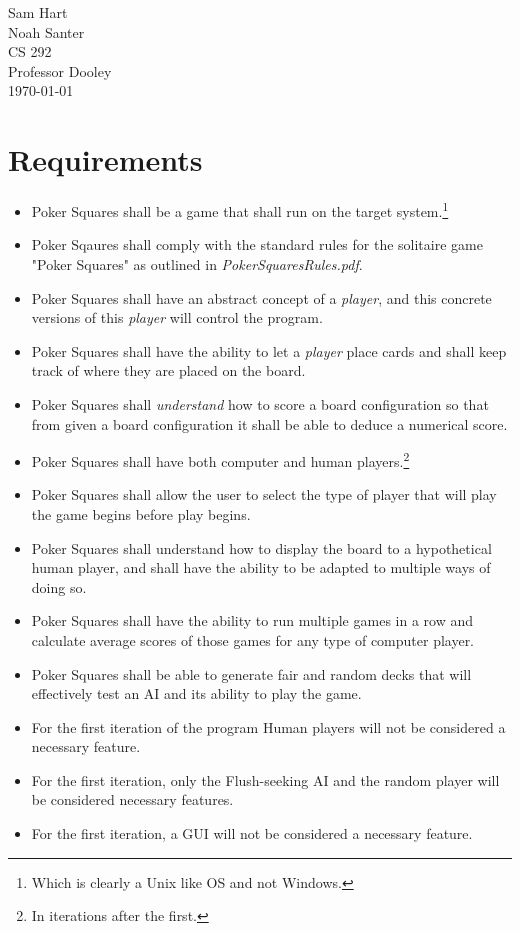 \documentclass[12pt]{article}
\begin{document}
\noindent Sam Hart \\
Noah Santer \\
CS 292 \\
Professor Dooley \\
\today \\

\section{Requirements}

\begin{itemize}
    \item Poker Squares shall be a game that shall run on the target system.\footnote[1]{Which is clearly a Unix like OS and not Windows.}
    \item Poker Sqaures shall comply with the standard rules for the solitaire game "Poker Squares" as outlined in \textit{PokerSquaresRules.pdf}.
    \item Poker Squares shall have an abstract concept of a \textit{player}, and this concrete versions of this \textit{player} will control the program.
    \item Poker Squares shall have the ability to let a \textit{player} place cards and shall keep track of where they are placed on the board.
    \item Poker Squares shall \textit{understand} how to score a board configuration so that from given a board configuration it shall be able to deduce a numerical score.
    \item Poker Squares shall have both computer and human players.\footnote[2]{In iterations after the first.}
    \item Poker Squares shall allow the user to select the type of player that will play the game begins before play begins.
    \item Poker Squares shall understand how to display the board to a hypothetical human player, and shall have the ability to be adapted to multiple ways of doing so.
    \item Poker Squares shall have the ability to run multiple games in a row and calculate average scores of those games for any type of computer player.
    \item Poker Squares shall be able to generate fair and random decks that will effectively test an AI and its ability to play the game.
    \item For the first iteration of the program Human players will not be considered a necessary feature.
    \item For the first iteration, only the Flush-seeking AI and the random player will be considered necessary features.
    \item For the first iteration, a GUI will not be considered a necessary feature.
\end{itemize}
\end{document}
